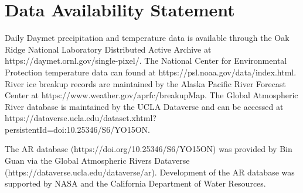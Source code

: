 \documentclass[12pts,draft]{AR_analysis_}
\begin{document}
%
%

\section*{Data Availability Statement}
Daily Daymet precipitation and temperature data is available through the Oak Ridge 
National Laboratory Distributed Active Archive at https://daymet.ornl.gov/single-pixel/.
The National Center for Environmental Protection temperature data can found at
https://psl.noaa.gov/data/index.html.
River ice breakup records are maintained by the Alaska Pacific River Forecast Center 
at https://www.weather.gov/aprfc/breakupMap. The Global Atmospheric River 
database is maintained by the UCLA Dataverse and can be accessed at 
https://dataverse.ucla.edu/dataset.xhtml?persistentId=doi:10.25346/S6/YO15ON.




\acknowledgments
The AR database (https://doi.org/10.25346/S6/YO15ON) was provided by 
Bin Guan via the Global Atmospheric Rivers Dataverse 
(https://dataverse.ucla.edu/dataverse/ar). Development 
of the AR database was supported by NASA and the California 
Department of Water Resources.


%
%

%



%
%
%
%
%
\end{document}
